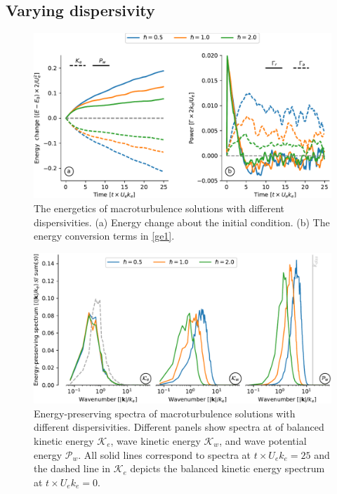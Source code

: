 \documentclass{jfm}
\begin{document}
\subsection{Varying dispersivity}
\begin{figure}
\label{stats_turb_various}
\centering
\includegraphics[width=1.\textwidth]{figs/fig6.pdf}
\caption{The energetics of macroturbulence solutions with different
         dispersivities. (a) Energy change about the initial condition.
         (b) The energy conversion terms in \eqref{ge1}.
        }
\end{figure}

\begin{figure}
\label{spectra_turb_various}
\centering
\includegraphics[width=1.\textwidth]{figs/FigSpectraVarious.pdf}
\caption{Energy-preserving spectra of macroturbulence solutions with different
         dispersivities. Different panels show spectra at of balanced kinetic energy
          $\mathcal{K}_e$, wave kinetic energy $\mathcal{K}_w$, and wave potential
          energy $\mathcal{P}_w$. All solid lines correspond to spectra at
          $t\times U_e k_e = 25$ and the dashed line in $\mathcal{K}_e$ depicts
          the balanced kinetic energy spectrum at $t\times U_e k_e = 0$.
        }
\end{figure}
\end{document}
